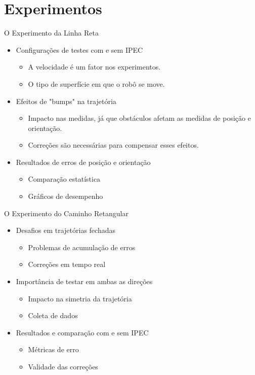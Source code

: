 \documentclass[xcolor=dvipsnames, aspectratio=169]{beamer}
\begin{document}
\section{Experimentos}
\begin{frame}{O Experimento da Linha Reta}
  \begin{itemize}
    \item Configurações de testes com e sem IPEC
      \begin{itemize}
        \item A velocidade é um fator nos experimentos.
        \item O tipo de superfície em que o robô se move.
      \end{itemize}
    \item Efeitos de "bumps" na trajetória
      \begin{itemize}
        \item Impacto nas medidas, já que obstáculos afetam as medidas de posição e orientação.
        \item Correções são necessárias para compensar esses efeitos.
      \end{itemize}
    \item Resultados de erros de posição e orientação
      \begin{itemize}
        \item Comparação estatística
        \item Gráficos de desempenho
      \end{itemize}
  \end{itemize}
\end{frame}

\begin{frame}{O Experimento do Caminho Retangular}
  \begin{itemize}
    \item Desafios em trajetórias fechadas
      \begin{itemize}
        \item Problemas de acumulação de erros
        \item Correções em tempo real
      \end{itemize}
    \item Importância de testar em ambas as direções
      \begin{itemize}
        \item Impacto na simetria da trajetória
        \item Coleta de dados
      \end{itemize}
    \item Resultados e comparação com e sem IPEC
      \begin{itemize}
        \item Métricas de erro
        \item Validade das correções
      \end{itemize}
  \end{itemize}
\end{frame}
\end{document}
